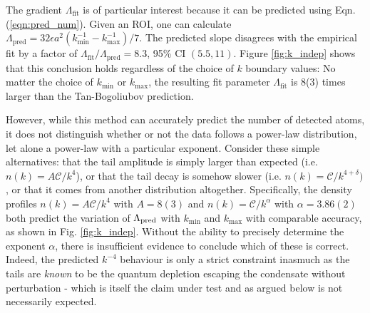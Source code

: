 	The gradient $\Lambda_\textrm{fit}$ is of particular interest because it can be predicted using Eqn. (\ref{eqn:pred_num}).
	Given an ROI, one can calculate $\Lambda_\textrm{pred} = 32\epsilon a^2(k_{\textrm{min}}^{-1}-k_{\textrm{max}}^{-1})/7$.
	The predicted slope disagrees with the empirical fit by a factor of $\Lambda_\textrm{fit}/\Lambda_\textrm{pred}= 8.3$, 95\% CI $(5.5,11)$.
	Figure \ref{fig:k_indep} shows that this conclusion holds regardless of the choice of $k$ boundary values: No matter the choice of $k_\textrm{min}$ or $k_\textrm{max}$, the resulting fit parameter $\Lambda_\textrm{fit}$ is 8(3) times larger than the Tan-Bogoliubov prediction. 

	However, while this method can accurately predict the number of detected atoms, it does not distinguish whether or not the data follows a power-law distribution, let alone a power-law with a particular exponent. 
	Consider these simple alternatives: that the tail amplitude is simply larger than expected (i.e. $n(k)=A\mathcal{C}/k^4$), or that the tail decay is somehow slower (i.e. $n(k)=\mathcal{C}/k^{4+\delta})$, or that it comes from another distribution altogether.
	Specifically, the density profiles $n(k)=A\mathcal{C}/k^4$ with $A=8(3)$ and $n(k)=\mathcal{C}/k^{\alpha}$ with $\alpha=3.86(2)$ both predict the variation of $\Lambda_{\rm pred}$ with $k_\textrm{min}$ and $k_\textrm{max}$ with comparable accuracy, as shown in Fig. \ref{fig:k_indep}. 
	Without the ability to precisely determine the exponent $\alpha$, there is insufficient evidence to conclude which of these is correct.
	Indeed, the predicted $k^{-4}$ behaviour is only a strict constraint inasmuch as the tails are \emph{known} to be the quantum depletion escaping the condensate without perturbation - which is itself the claim under test and as argued below is not necessarily expected.

